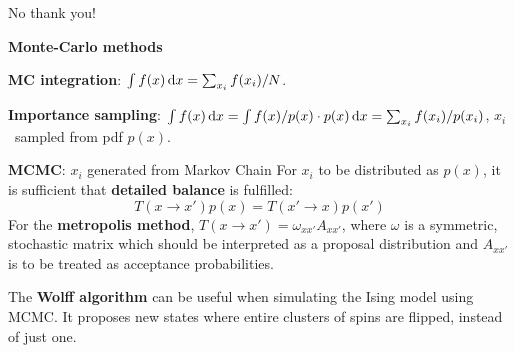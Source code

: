 \documentclass[10pt,landscape]{article}
\newcommand{\topiccolor}{green}
\newcommand{\topic}[2]{%
	\renewcommand{\topiccolor}{#1}
	\begin{tcolorbox}[boxsep=0.5mm, left=1mm, right=1mm, top=0mm, bottom=0mm,
		colback=#1!30, colframe=#1, arc is angular]%
		\centering \textbf{#2}%
	\end{tcolorbox}%
}
\newcommand{\cbf}[1]{\textcolor{\topiccolor!70!black}{\textbf{#1}}}
\begin{document}
\begin{multicols*}{3}
No thank you!

\topic{red}{Monte-Carlo methods}

\cbf{MC integration}:
$\int f(x) \dl x = \sum_{x_i} f(x_i)/N$.

\cbf{Importance sampling}:
$\int f(x) \dl x = \int f(x)/p(x) \cdot p(x) \dl x = \sum_{x_i} f(x_i) / p(x_i)$,
$x_i$ sampled from pdf $p(x)$.

\cbf{MCMC}: $x_i$ generated from Markov Chain
For $x_i$ to be distributed as $p(x)$, it is sufficient that
\cbf{detailed balance} is fulfilled:
\[
	T(x \to x') p(x) = T(x' \to x) p(x')
\]
For the \cbf{metropolis method}, $T(x \to x') = \omega_{xx'}A_{x x'}$,
where $\omega$ is a symmetric, stochastic matrix which should
be interpreted as a proposal distribution and $A_{x x'}$ is
to be treated as acceptance probabilities.

The \cbf{Wolff algorithm} can be useful when simulating the Ising model
using MCMC.
It proposes new states where entire clusters of spins are flipped,
instead of just one.


\end{multicols*}
\end{document}
